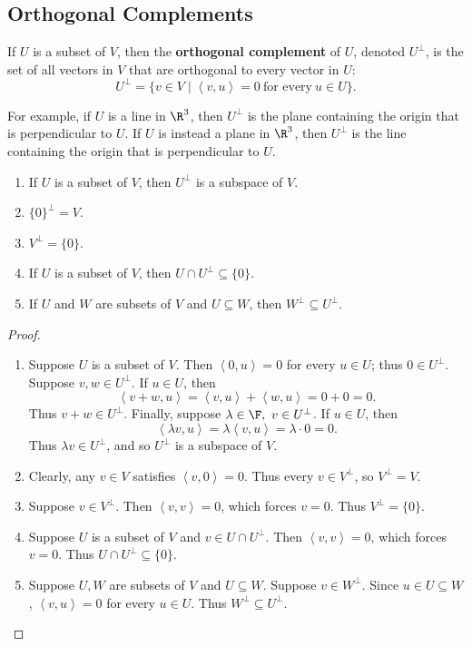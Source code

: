 \documentclass[math0540-lecture-notes.tex]{subfiles}
\begin{document}
\subsection{Orthogonal Complements}
\begin{definition}{}
  If $U$ is a subset of $V$, then the \textbf{orthogonal complement} of $U$, denoted $U^{\bot}$, is
  the set of all vectors in $V$ that are orthogonal to every vector in $U$: \[
    U^{\bot}=\{v\in V\mid \left<v,u \right> =0~\text{for every}~u\in U\} 
  .\]
\end{definition}
For example, if $U$ is a line in $\R^3$, then $U^{\bot}$ is the plane containing the origin that is
perpendicular to $U$. If $U$ is instead a plane in $\R^3$, then $U^{\bot}$ is the line containing
the origin that is perpendicular to $U$.
\begin{proposition}{}
  \begin{enumerate}
    \item If $U$ is a subset of $V$, then $U^{\bot}$ is a subspace of $V$.
    \item $\{ 0 \}^{\bot}=V$.
    \item $V^{\bot}=\{ 0 \}$.
    \item If $U$ is a subset of $V$, then $U\cap U^{\bot}\subseteq \{ 0 \}$.
    \item If $U$ and $W$ are subsets of $V$ and $U\subseteq W$, then $W^{\bot}\subseteq U^{\bot}$.
  \end{enumerate}
\end{proposition}
\begin{proof}[Proof]
  \begin{enumerate}
    \item Suppose $U$ is a subset of $V$. Then $\left<0,u \right> =0$ for every $u\in U$; thus $0\in
        U^{\bot}$.
      Suppose $v,w\in U^{\bot}$. If $u\in U$, then \[
        \left<v+w,u \right> =\left<v,u \right> +\left<w,u \right> =0+0=0
      .\] Thus $v+w\in U^{\bot}$.
      Finally, suppose $\lambda\in \F,\ v\in U^{\bot}$. If $u\in U$, then \[
        \left<\lambda v,u \right> =\lambda\left<v,u \right> =\lambda\cdot 0=0
      .\] Thus $\lambda v\in U^{\bot}$, and so $U^{\bot}$ is a subspace of $V$.

    \item Clearly, any $v\in V$ satisfies $\left<v,0 \right> =0$. Thus every $v\in V^{\bot}$, so
      $V^{\bot}=V$.
    \item Suppose $v\in V^{\bot}$. Then $\left<v,v \right> =0$, which forces $v=0$. Thus
      $V^{\bot}=\{ 0 \}$.
    \item Suppose $U$ is a subset of $V$ and $v\in U\cap U^{\bot}$. Then $\left<v,v \right> =0$,
      which forces $v=0$. Thus $U\cap U^{\bot}\subseteq \{ 0 \}$.
    \item Suppose $U,W$ are subsets of $V$ and $U\subseteq W$. Suppose $v\in W^{\bot}$. Since $u\in
      U\subseteq W$, $\left<v,u \right> =0$ for every $u\in U$. Thus $W^{\bot}\subseteq U^{\bot}$.
  \end{enumerate}
\end{proof}
\end{document}

